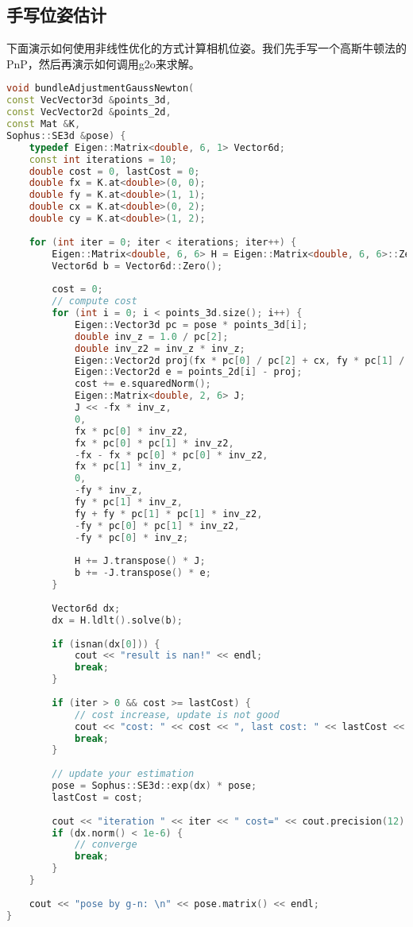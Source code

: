 \subsection{手写位姿估计}
下面演示如何使用非线性优化的方式计算相机位姿。我们先手写一个高斯牛顿法的PnP，然后再演示如何调用g2o来求解。  
\begin{lstlisting}[language=c++,caption=slambook2/ch7/pose_estimation_3d2d.cpp（片段）]
void bundleAdjustmentGaussNewton(
const VecVector3d &points_3d,
const VecVector2d &points_2d,
const Mat &K,
Sophus::SE3d &pose) {
	typedef Eigen::Matrix<double, 6, 1> Vector6d;
	const int iterations = 10;
	double cost = 0, lastCost = 0;
	double fx = K.at<double>(0, 0);
	double fy = K.at<double>(1, 1);
	double cx = K.at<double>(0, 2);
	double cy = K.at<double>(1, 2);
	
	for (int iter = 0; iter < iterations; iter++) {
		Eigen::Matrix<double, 6, 6> H = Eigen::Matrix<double, 6, 6>::Zero();
		Vector6d b = Vector6d::Zero();
		
		cost = 0;
		// compute cost
		for (int i = 0; i < points_3d.size(); i++) {
			Eigen::Vector3d pc = pose * points_3d[i];
			double inv_z = 1.0 / pc[2];
			double inv_z2 = inv_z * inv_z;
			Eigen::Vector2d proj(fx * pc[0] / pc[2] + cx, fy * pc[1] / pc[2] + cy);
			Eigen::Vector2d e = points_2d[i] - proj;
			cost += e.squaredNorm();
			Eigen::Matrix<double, 2, 6> J;
			J << -fx * inv_z,
			0,
			fx * pc[0] * inv_z2,
			fx * pc[0] * pc[1] * inv_z2,
			-fx - fx * pc[0] * pc[0] * inv_z2,
			fx * pc[1] * inv_z,
			0,
			-fy * inv_z,
			fy * pc[1] * inv_z,
			fy + fy * pc[1] * pc[1] * inv_z2,
			-fy * pc[0] * pc[1] * inv_z2,
			-fy * pc[0] * inv_z;
			
			H += J.transpose() * J;
			b += -J.transpose() * e;
		}
		
		Vector6d dx;
		dx = H.ldlt().solve(b);
		
		if (isnan(dx[0])) {
			cout << "result is nan!" << endl;
			break;
		}
		
		if (iter > 0 && cost >= lastCost) {
			// cost increase, update is not good
			cout << "cost: " << cost << ", last cost: " << lastCost << endl;
			break;
		}
		
		// update your estimation
		pose = Sophus::SE3d::exp(dx) * pose;
		lastCost = cost;
		
		cout << "iteration " << iter << " cost=" << cout.precision(12) << cost << endl;
		if (dx.norm() < 1e-6) {
			// converge
			break;
		}
	}
	
	cout << "pose by g-n: \n" << pose.matrix() << endl;
}
\end{lstlisting}

